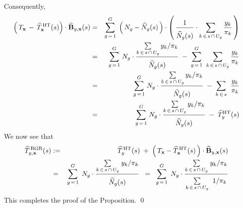 Consequently,
\begin{eqnarray*}
\left(\,T_{\mathbf{x}} \,-\, \widehat{T}^{\,\textnormal{HT}}_{\mathbf{x}}(s)\right)
\cdot
\widehat{\mathbf{B}}_{y,\mathbf{x}}(s)
& = &
	\overset{G}{\underset{g\,=\,1}{\sum}}\;
	\left(\,N_{g} - \widehat{N}_{g}(s) \,\right)
	\cdot
	\left(\,
		\dfrac{1}{\overset{{\color{white}.}}{\widehat{N}_{g}(s)}}
		\cdot
		\underset{k\,\in\,s\,\cap\,U_{g}}{\sum}\, \dfrac{y_{k}}{\pi_{k}}
	\,\right)
\\
& = &
	\overset{G}{\underset{g\,=\,1}{\sum}}\;
	N_{g} \cdot \dfrac{ \underset{k\,\in\,s\,\cap\,U_{g}}{\sum}\, y_{k}/\pi_{k} }{\overset{{\color{white}.}}{\widehat{N}_{g}(s)}}
	\; - \;
	\overset{G}{\underset{g\,=\,1}{\sum}}\;\;
	\underset{k\,\in\,s\,\cap\,U_{g}}{\sum}\, \dfrac{y_{k}}{\pi_{k}}
\\
& = &
	\overset{G}{\underset{g\,=\,1}{\sum}}\;
	N_{g} \cdot \dfrac{ \underset{k\,\in\,s\,\cap\,U_{g}}{\sum}\, y_{k}/\pi_{k} }{\overset{{\color{white}.}}{\widehat{N}_{g}(s)}}
	\; - \;
	\underset{k\,\in\,s}{\sum}\;\;\dfrac{y_{k}}{\pi_{k}}
\\
& = &
	\overset{G}{\underset{g\,=\,1}{\sum}}\;
	N_{g} \cdot \dfrac{ \underset{k\,\in\,s\,\cap\,U_{g}}{\sum}\, y_{k}/\pi_{k} }{\overset{{\color{white}.}}{\widehat{N}_{g}(s)}}
	\; - \;
	\widehat{T}^{\textnormal{HT}}_{y}(s)
\end{eqnarray*}
We now see that
\begin{eqnarray*}
\widehat{T}^{\,\textnormal{RGR}}_{y,\mathbf{x}}(s)
& := &
	\widehat{T}^{\,\textnormal{HT}}_{y}(s)
	\; + \;
	\left(\,T_{\mathbf{x}} - \widehat{T}^{\,\textnormal{HT}}_{\mathbf{x}}(s) \,\right)
	\cdot
	\widehat{\mathbf{B}}_{y,\mathbf{x}}(s)
\\
& = &
	\overset{G}{\underset{g\,=\,1}{\sum}}\;\, N_{g}
	\cdot
	\dfrac{
		\underset{k\,\in\,s\,\cap\,U_{g}}{\sum}\;y_{k}/\pi_{k}
		}{
		\overset{{\color{white}.}}{\widehat{N}_{g}(s)}
		}
\;\; = \;\;
	\overset{G}{\underset{g\,=\,1}{\sum}}\;\, N_{g}
	\cdot
	\dfrac{
		\underset{k\,\in\,s\,\cap\,U_{g}}{\sum}\;y_{k}/\pi_{k}
		}{
		\underset{k\,\in\,s\,\cap\,U_{g}}{\overset{{\color{white}.}}{\sum}}\;\;1/\pi_{k}
		}
\end{eqnarray*}
This completes the proof of the Proposition.
\qed


\renewcommand{\theenumi}{\roman{enumi}}
\renewcommand{\labelenumi}{\textnormal{(\theenumi)}$\;\;$}

